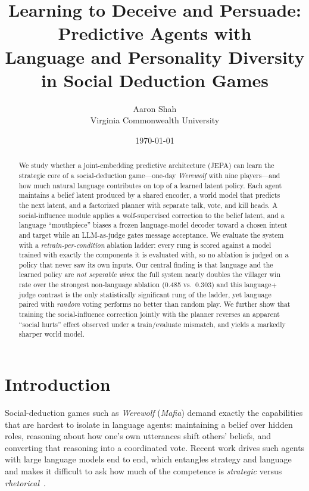\documentclass[11pt]{article}
\title{Learning to Deceive and Persuade: Predictive Agents with\\
Language and Personality Diversity in Social Deduction Games}
\author{Aaron Shah\\ Virginia Commonwealth University}
\date{\today}
\newcommand{\num}[1]{#1}
\begin{document}
\maketitle

\begin{abstract}
We study whether a joint-embedding predictive architecture (JEPA) can learn the
strategic core of a social-deduction game---one-day \textit{Werewolf} with nine
players---and how much natural language contributes on top of a learned latent
policy. Each agent maintains a belief latent produced by a shared encoder, a
world model that predicts the next latent, and a factorized planner with
separate talk, vote, and kill heads. A social-influence module applies a
wolf-supervised correction to the belief latent, and a language ``mouthpiece''
biases a frozen language-model decoder toward a chosen intent and target while an
LLM-as-judge gates message acceptance. We evaluate the system with a
\textit{retrain-per-condition} ablation ladder: every rung is scored against a
model trained with exactly the components it is evaluated with, so no ablation is
judged on a policy that never saw its own inputs. Our central finding is that
language and the learned policy are \emph{not separable wins}: the full system
nearly doubles the villager win rate over the strongest non-language ablation
(\num{0.485} vs.\ \num{0.303}) and this language$+$judge contrast is the only
statistically significant rung of the ladder, yet language paired with
\emph{random} voting performs no better than random play. We further show that
training the social-influence correction jointly with the planner reverses an
apparent ``social hurts'' effect observed under a train/evaluate mismatch, and
yields a markedly sharper world model.
\end{abstract}

\section{Introduction}
Social-deduction games such as \textit{Werewolf} (\textit{Mafia}) demand exactly
the capabilities that are hardest to isolate in language agents: maintaining a
belief over hidden roles, reasoning about how one's own utterances shift others'
beliefs, and converting that reasoning into a coordinated vote. Recent work
drives such agents with large language models end to end, which entangles
strategy and language and makes it difficult to ask how much of the competence is
\emph{strategic} versus \emph{rhetorical}~\citep{xu2023werewolf}.
\end{document}
